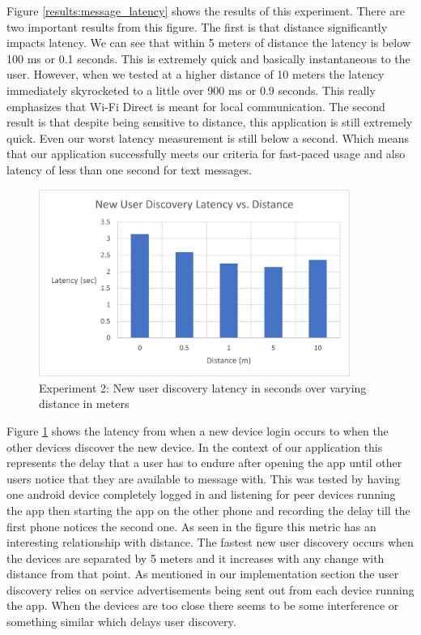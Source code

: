 \documentclass[10pt]{article}
\begin{document}
Figure \ref{results:message_latency} shows the results of this experiment. There are two important results from this figure. The first is that distance significantly impacts latency. We can see that within 5 meters of distance the latency is below 100 ms or 0.1 seconds. This is extremely quick and basically instantaneous to the user. However, when we tested at a higher distance of 10 meters the latency immediately skyrocketed to a little over 900 ms or 0.9 seconds. This really emphasizes that Wi-Fi Direct is meant for local communication. The second result is that despite being sensitive to distance, this application is still extremely quick. Even our worst latency measurement is still below a second. Which means that our application successfully meets our criteria for fast-paced usage and also latency of less than one second for text messages.

\begin{figure}[h!]
    \centering
    \includegraphics[width=4in]{new_user_dicovery_graph.png}
    \caption{Experiment 2: New user discovery latency in seconds over varying distance in meters}
    \label{results:new_user}
\end{figure}

Figure \ref{results:new_user} shows the latency from when a new device login occurs to when the other devices discover the new device. In the context of our application this represents the delay that a user has to endure after opening the app until other users notice that they are available to message with. This was tested by having one android device completely logged in and listening for peer devices running the app then starting the app on the other phone and recording the delay till the first phone notices the second one. As seen in the figure this metric has an interesting relationship with distance. The fastest new user discovery occurs when the devices are separated by 5 meters and it increases with any change with distance from that point. As mentioned in our implementation section the user discovery relies on service advertisements being sent out from each device running the app. When the devices are too close there seems to be some interference or something similar which delays user discovery.
\end{document}
